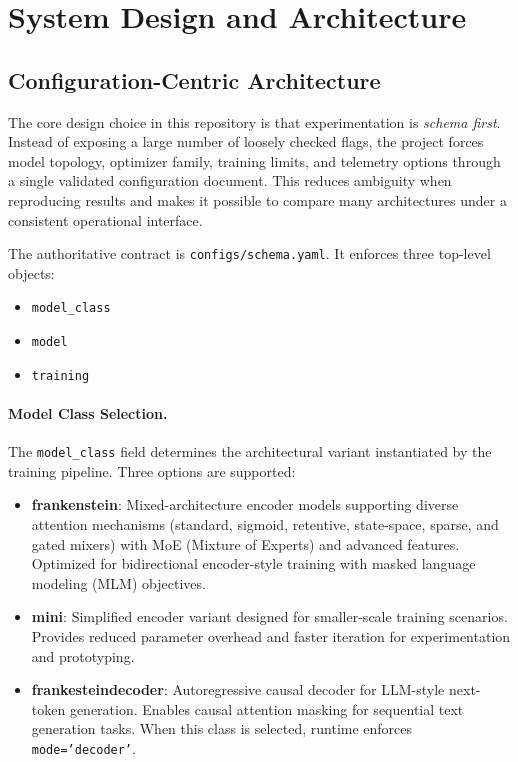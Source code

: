 \section{System Design and Architecture}
\label{sec:system-design}

\subsection{Configuration-Centric Architecture}
\label{sec:config-centric-architecture}

The core design choice in this repository is that experimentation is \emph{schema first}. Instead of exposing a large number of loosely checked flags, the project forces model topology, optimizer family, training limits, and telemetry options through a single validated configuration document. This reduces ambiguity when reproducing results and makes it possible to compare many architectures under a consistent operational interface.

The authoritative contract is \texttt{configs/schema.yaml}. It enforces three top-level objects:
\begin{itemize}[leftmargin=*]
    \item \texttt{model\_class}
    \item \texttt{model}
    \item \texttt{training}
\end{itemize}

\paragraph{Model Class Selection.}
The \texttt{model\_class} field determines the architectural variant instantiated by the training pipeline. Three options are supported:
\begin{itemize}[leftmargin=*]
    \item \textbf{frankenstein}: Mixed-architecture encoder models supporting diverse attention mechanisms (standard, sigmoid, retentive, state-space, sparse, and gated mixers) with MoE (Mixture of Experts) and advanced features. Optimized for bidirectional encoder-style training with masked language modeling (MLM) objectives.
    \item \textbf{mini}: Simplified encoder variant designed for smaller-scale training scenarios. Provides reduced parameter overhead and faster iteration for experimentation and prototyping.
    \item \textbf{frankesteindecoder}: Autoregressive causal decoder for LLM-style next-token generation. Enables causal attention masking for sequential text generation tasks. When this class is selected, runtime enforces \texttt{mode='decoder'}. 
\end{itemize}

